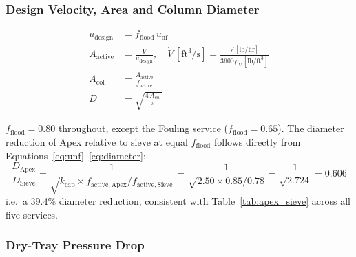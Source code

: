 \documentclass[11pt,letterpaper]{article}
\newcommand{\unf}{u_{\mathrm{nf}}}
\newcommand{\udesign}{u_{\mathrm{design}}}
\begin{document}
\subsubsection{Design Velocity, Area and Column Diameter}
\label{sec:sizing}

\begin{align}
  \udesign &= f_{\mathrm{flood}}\,\unf
  \label{eq:udesign}\\
  A_{\mathrm{active}} &= \frac{\dot{V}}{\udesign}, \quad
  \dot{V}\,[\mathrm{ft}^3/\mathrm{s}] = \frac{V\,[\mathrm{lb/hr}]}
    {3600\,\rho_V\,[\mathrm{lb/ft}^3]}
  \label{eq:aactive}\\
  A_{\mathrm{col}} &= \frac{A_{\mathrm{active}}}{f_{\mathrm{active}}}
  \label{eq:acol}\\
  D &= \sqrt{\frac{4\,A_{\mathrm{col}}}{\pi}}
  \label{eq:diameter}
\end{align}

$f_{\mathrm{flood}} = 0.80$ throughout, except the Fouling service
($f_{\mathrm{flood}} = 0.65$).  The diameter reduction of Apex relative to
sieve at equal $f_{\mathrm{flood}}$ follows directly from
Equations~\eqref{eq:unf}--\eqref{eq:diameter}:
\begin{equation}
  \frac{D_{\mathrm{Apex}}}{D_{\mathrm{Sieve}}} =
  \frac{1}{\sqrt{k_{\mathrm{cap}}\times f_{\mathrm{active,Apex}}/f_{\mathrm{active,Sieve}}}}
  = \frac{1}{\sqrt{2.50\times 0.85/0.78}} = \frac{1}{\sqrt{2.724}} = 0.606
  \label{eq:dratio}
\end{equation}
i.e.\ a 39.4\% diameter reduction, consistent with Table~\ref{tab:apex_sieve}
across all five services.

\subsubsection{Dry-Tray Pressure Drop}
\label{sec:dpdry}
\end{document}
